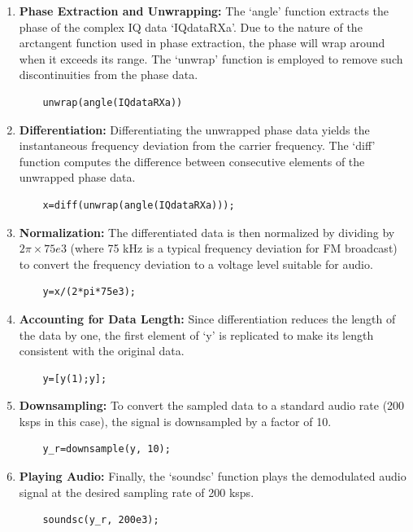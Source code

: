 \documentclass{article}
\begin{document}
\begin{enumerate}
    \item \textbf{Phase Extraction and Unwrapping:} The `angle' function extracts the phase of the complex IQ data `IQdataRXa'. Due to the nature of the arctangent function used in phase extraction, the phase will wrap around when it exceeds its range. The `unwrap' function is employed to remove such discontinuities from the phase data.
    
    \begin{lstlisting}
    unwrap(angle(IQdataRXa))
    \end{lstlisting}
    
    \item \textbf{Differentiation:} Differentiating the unwrapped phase data yields the instantaneous frequency deviation from the carrier frequency. The `diff' function computes the difference between consecutive elements of the unwrapped phase data.

    \begin{lstlisting}
    x=diff(unwrap(angle(IQdataRXa)));
    \end{lstlisting}
    
    \item \textbf{Normalization:} The differentiated data is then normalized by dividing by \(2\pi \times 75e3\) (where 75 kHz is a typical frequency deviation for FM broadcast) to convert the frequency deviation to a voltage level suitable for audio.

    \begin{lstlisting}
    y=x/(2*pi*75e3);
    \end{lstlisting}
    
    \item \textbf{Accounting for Data Length:} Since differentiation reduces the length of the data by one, the first element of `y' is replicated to make its length consistent with the original data.

    \begin{lstlisting}
    y=[y(1);y];
    \end{lstlisting}
    
    \item \textbf{Downsampling:} To convert the sampled data to a standard audio rate (200 ksps in this case), the signal is downsampled by a factor of 10.

    \begin{lstlisting}
    y_r=downsample(y, 10);
    \end{lstlisting}
    
    \item \textbf{Playing Audio:} Finally, the `soundsc' function plays the demodulated audio signal at the desired sampling rate of 200 ksps.

    \begin{lstlisting}
    soundsc(y_r, 200e3);
    \end{lstlisting}
\end{enumerate}
\end{document}
